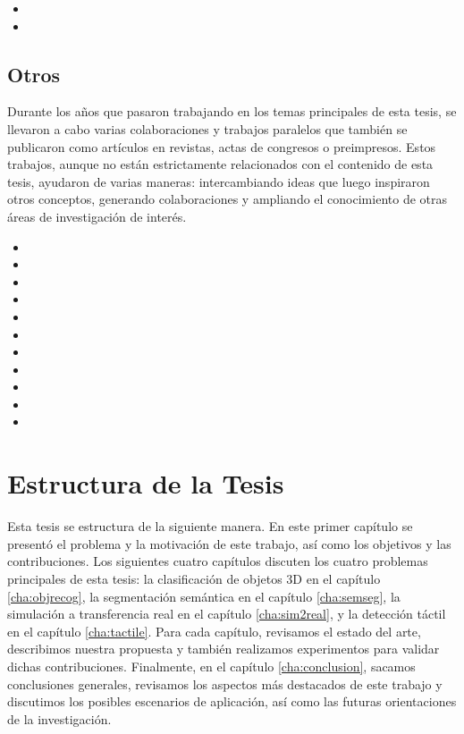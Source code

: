 \begin{itemize}
	\item {}
	\item {}
\end{itemize}

\subsection{Otros}

Durante los años que pasaron trabajando en los temas principales de esta tesis, se llevaron a cabo varias colaboraciones y trabajos paralelos que también se publicaron como artículos en revistas, actas de congresos o preimpresos. Estos trabajos, aunque no están estrictamente relacionados con el contenido de esta tesis, ayudaron de varias maneras: intercambiando ideas que luego inspiraron otros conceptos, generando colaboraciones y ampliando el conocimiento de otras áreas de investigación de interés.

\begin{itemize}
	\item {}
	\item {}
	\item {}
	\item {}
	\item {}
	\item {}
	\item {}
	\item {}
	\item {}
	\item {}
	\item {}
\end{itemize}

\section{Estructura de la Tesis}

Esta tesis se estructura de la siguiente manera. En este primer capítulo se presentó el problema y la motivación de este trabajo, así como los objetivos y las contribuciones. Los siguientes cuatro capítulos discuten los cuatro problemas principales de esta tesis: la clasificación de objetos 3D en el capítulo \ref{cha:objrecog}, la segmentación semántica en el capítulo \ref{cha:semseg}, la simulación a transferencia real en el capítulo \ref{cha:sim2real}, y la detección táctil en el capítulo \ref{cha:tactile}. Para cada capítulo, revisamos el estado del arte, describimos nuestra propuesta y también realizamos experimentos para validar dichas contribuciones. Finalmente, en el capítulo \ref{cha:conclusion}, sacamos conclusiones generales, revisamos los aspectos más destacados de este trabajo y discutimos los posibles escenarios de aplicación, así como las futuras orientaciones de la investigación.

